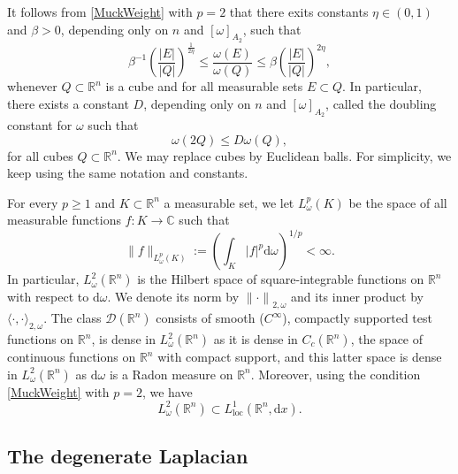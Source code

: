 \documentclass[12pt, letterpaper]{amsart}
\theoremstyle{definition}
\theoremstyle{remark}
\numberwithin{equation}{section}
\begin{document}
It follows from \eqref{MuckWeight} with $p=2$ that there exits constants $\eta \in (0,1)$ and $\beta >0$, depending only on $n$ and $ [ \omega  ]_{A_2}$, such that 
\begin{equation}\label{MuckProportion}
\beta^{-1}\left ( \frac{\left | E \right |}{\left | Q \right |} \right )^{\frac{1}{2\eta }}\leq \frac{\omega(E)}{\omega(Q)}\leq \beta\left ( \frac{\left | E \right |}{\left | Q \right |} \right )^{2\eta},
\end{equation}
whenever $Q \subset \mathbb{R}^n$ is a cube and for all measurable sets $E \subset Q$. In particular, there exists a constant $D$, depending only on $n$ and $ [ \omega  ]_{A_2}$, called the doubling constant for $\omega$ such that
\begin{equation}\label{DoublingMuck}
    \omega(2Q)\leq D \omega(Q),
\end{equation}
for all cubes $Q \subset \mathbb{R}^n$. We may replace cubes by Euclidean balls. For simplicity, we keep using the same notation and constants.


For every $p\ge 1$ and $K \subset \mathbb{R}^n$ a measurable set, we let $L^p_\omega(K)$ be the space of all measurable functions $f:K \rightarrow \mathbb{C}$ such that $$\|f\|_{L^p_\omega(K)}:=\left ( \int_K |f|^p \mathrm d \omega  \right )^{1/p}<\infty.$$
In particular, $L^2_\omega(\mathbb{R}^n)$ is the Hilbert space of square-integrable functions on $\mathbb{R}^n$ with respect to $\mathrm{d}\omega$. We denote its norm by ${\lVert \cdot \rVert}_{2,\omega}$ and its inner product by $\langle \cdot , \cdot \rangle_{2,\omega}$.  The class $\mathcal{D}(\mathbb{R}^n)$ consists of smooth ($C^\infty$), compactly supported test functions on $\mathbb{R}^n$, is dense in $L^2_{\omega}(\mathbb{R}^n)$ as it is dense in $C_c(\mathbb{R}^n)$, the space of continuous functions on $\mathbb{R}^n$ with compact support, and this latter space is dense in $L^2_{\omega}(\mathbb{R}^n)$ as $\mathrm d \omega$ is a Radon measure on $\mathbb{R}^n$. Moreover, using the condition \eqref{MuckWeight} with $p=2$, we have 
\begin{equation*}
L^2_{\omega}(\mathbb{R}^n) \subset L^1_{\text{loc}}(\mathbb{R}^n, \mathrm{d}x).
\end{equation*}



\subsection{The degenerate Laplacian}
\end{document}
